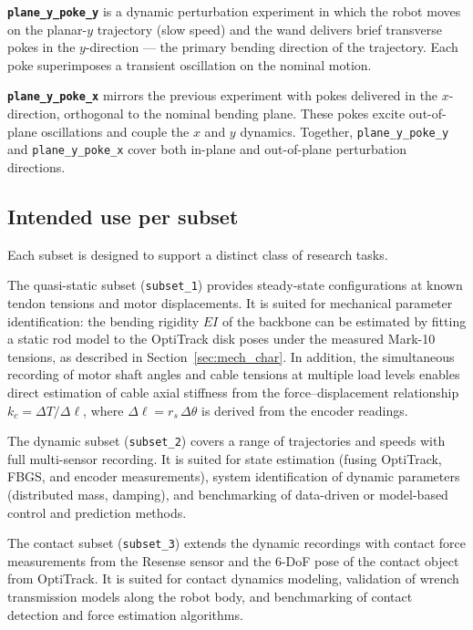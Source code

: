 \documentclass[14pt, a4paper]{article}
\begin{document}
\textbf{\texttt{plane\_y\_poke\_y}} is a dynamic perturbation experiment in which the robot moves on the planar-$y$ trajectory (slow speed) and the wand delivers brief transverse pokes in the $y$-direction — the primary bending direction of the trajectory.
Each poke superimposes a transient oscillation on the nominal motion.

\textbf{\texttt{plane\_y\_poke\_x}} mirrors the previous experiment with pokes delivered in the $x$-direction, orthogonal to the nominal bending plane.
These pokes excite out-of-plane oscillations and couple the $x$ and $y$ dynamics.
Together, \texttt{plane\_y\_poke\_y} and \texttt{plane\_y\_poke\_x} cover both in-plane and out-of-plane perturbation directions.



\subsection{Intended use per subset}

Each subset is designed to support a distinct class of research tasks.

The quasi-static subset (\texttt{subset\_1}) provides steady-state configurations at known
tendon tensions and motor displacements.
It is suited for mechanical parameter identification: the bending rigidity $EI$ of the
backbone can be estimated by fitting a static rod model to the OptiTrack disk poses under
the measured Mark-10 tensions, as described in Section~\ref{sec:mech_char}.
In addition, the simultaneous recording of motor shaft angles and cable tensions at
multiple load levels enables direct estimation of cable axial stiffness from the
force--displacement relationship $k_c = \Delta T / \Delta\ell$, where $\Delta\ell =
r_s\,\Delta\theta$ is derived from the encoder readings.

The dynamic subset (\texttt{subset\_2}) covers a range of trajectories and speeds with
full multi-sensor recording.
It is suited for state estimation (fusing OptiTrack, FBGS, and encoder measurements),
system identification of dynamic parameters (distributed mass, damping), and benchmarking
of data-driven or model-based control and prediction methods.

The contact subset (\texttt{subset\_3}) extends the dynamic recordings with contact force
measurements from the Resense sensor and the 6-DoF pose of the contact object from
OptiTrack.
It is suited for contact dynamics modeling, validation of wrench transmission models
along the robot body, and benchmarking of contact detection and force estimation
algorithms.
\end{document}
